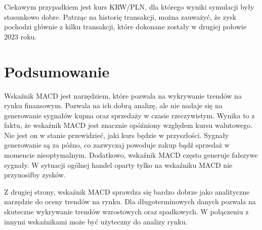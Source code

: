 \documentclass[12pt, a4paper]{article}
\begin{document}
Ciekawym przypadkiem jest kurs KRW/PLN, dla którego wyniki symulacji były stosunkowo dobre. Patrząc
na historię transakcji, można zauważyć, że zysk pochodzi głównie z kilku transakcji, które
dokonane zostały w drugiej połowie 2023 roku.

\section{Podsumowanie}
Wskaźnik MACD jest narzędziem, które pozwala na wykrywanie trendów na rynku finansowym.
Pozwala na ich dobrą analizę, ale nie nadaje się na generowanie sygnałów kupna oraz sprzedaży
w czasie rzeczywistym. Wynika to z faktu, że wskaźnik MACD jest znacznie opóźniony
względem kursu walutowego. Nie jest on w stanie przewidzieć, jaki kurs będzie
w przyszłości. Sygnały generowanie są za późno, co zazwyczaj powoduje
zakup bądź sprzedaż w momencie nieoptymalnym. Dodatkowo, wskaźnik MACD często
generuje fałszywe sygnały. W sytuacji ogólnej handel oparty tylko
na wskaźniku MACD nie przynosiłby zysków.

Z drugiej strony, wskaźnik MACD sprawdza się bardzo dobrze jako analityczne narzędzie
do oceny trendów na rynku. Dla długoterminowych danych pozwala na skuteczne
wykrywanie trendów wzrostowych oraz spadkowych. W połączeniu z innymi wskaźnikami
może być użyteczny do analizy rynku.
\end{document}

